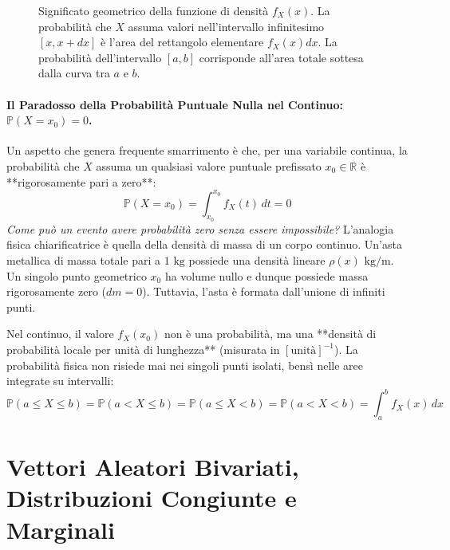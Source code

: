 \begin{figure}[htbp]
    \centering
    
    \caption{Significato geometrico della funzione di densità $f_X(x)$. La probabilità che $X$ assuma valori nell'intervallo infinitesimo $[x, x+dx]$ è l'area del rettangolo elementare $f_X(x)dx$. La probabilità dell'intervallo $[a, b]$ corrisponde all'area totale sottesa dalla curva tra $a$ e $b$.}
    \label{fig:pdf_area}
\end{figure}

\paragraph{Il Paradosso della Probabilità Puntuale Nulla nel Continuo: $\mathbb{P}(X = x_0) = 0$.}
Un aspetto che genera frequente smarrimento è che, per una variabile continua, la probabilità che $X$ assuma un qualsiasi valore puntuale prefissato $x_0 \in \mathbb{R}$ è **rigorosamente pari a zero**:
\begin{equation}
    \mathbb{P}(X = x_0) = \int_{x_0}^{x_0} f_X(t) \, dt = 0
\end{equation}
\emph{Come può un evento avere probabilità zero senza essere impossibile?}
L'analogia fisica chiarificatrice è quella della densità di massa di un corpo continuo. Un'asta metallica di massa totale pari a $1\text{ kg}$ possiede una densità lineare $\rho(x) \text{ kg/m}$. Un singolo punto geometrico $x_0$ ha volume nullo e dunque possiede massa rigorosamente zero ($dm = 0$). Tuttavia, l'asta è formata dall'unione di infiniti punti. 

Nel continuo, il valore $f_X(x_0)$ non è una probabilità, ma una **densità di probabilità locale per unità di lunghezza** (misurata in $[\text{unità}]^{-1}$). La probabilità fisica non risiede mai nei singoli punti isolati, bensì nelle aree integrate su intervalli:
\begin{equation}
    \mathbb{P}(a \le X \le b) = \mathbb{P}(a < X \le b) = \mathbb{P}(a \le X < b) = \mathbb{P}(a < X < b) = \int_a^b f_X(x) \, dx
\end{equation}

\section{Vettori Aleatori Bivariati, Distribuzioni Congiunte e Marginali}
\label{sec:vettori_aleatori}

